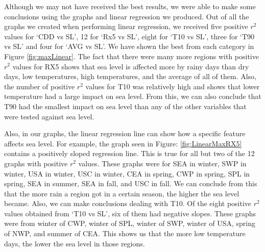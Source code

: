 \documentclass[12pt]{report}
\begin{document}
	\par Although we may not have received the best results, we were able to make some conclusions using the graphs and linear regression we produced. Out of all the graphs we created when performing linear regression, we received five positive $r^2$ values for \textquoteleft CDD vs SL', 12 for \textquoteleft Rx5 vs SL', eight for \textquoteleft T10 vs SL', three for \textquoteleft T90 vs SL' and four for \textquoteleft AVG vs SL'. We have shown the best from each category in Figure \ref{fig:maxLinear}. The fact that there were many more regions with positive $r^2$ values for RX5 shows that sea level is affected more by rainy days than dry days, low temperatures, high temperatures, and the average of all of them. Also, the number of positive $r^2$ values for T10 was relatively high and shows that lower temperature had a large impact on sea level. From this, we can also conclude that T90 had the smallest impact on sea level than any of the other variables that were tested against sea level. 
	\par Also, in our graphs, the linear regression line can show how a specific feature affects sea level. For example, the graph seen in Figure: \ref{fig:LinearMaxRX5} contains a positively sloped regression line. This is true for all but two of the 12 graphs with positive $r^2$ values. These graphs were for SEA in winter, SWP in winter, USA in winter, USC in winter, CEA in spring, CWP in spring, SPL in spring, SEA in summer, SEA in fall, and USC in fall. We can conclude from this that the more rain a region got in a certain season, the higher the sea level became. Also, we can make conclusions dealing with T10. Of the eight positive $r^2$ values obtained from \textquoteleft T10 vs SL', six of them had negative slopes. These graphs were from winter of CWP, winter of SPL, winter of SWP, winter of USA, spring of NWP, and summer of CEA. This shows us that the more low temperature days, the lower the sea level in those regions. 
\end{document}
